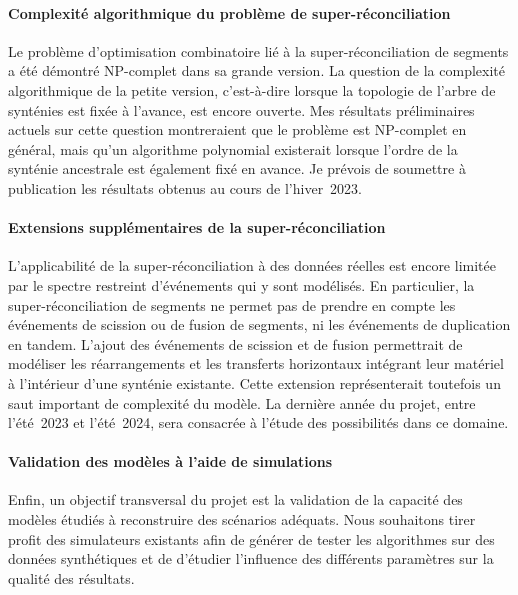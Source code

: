 \paragraph{Complexité algorithmique du problème de super-réconciliation}
Le problème d’optimisation combinatoire lié à la super-réconciliation de segments a été démontré NP-complet dans sa grande version.
La question de la complexité algorithmique de la petite version, c’est-à-dire lorsque la topologie de l’arbre de synténies est fixée à l’avance, est encore ouverte.
Mes résultats préliminaires actuels sur cette question montreraient que le problème est NP-complet en général, mais qu’un algorithme polynomial existerait lorsque l’ordre de la synténie ancestrale est également fixé en avance.
Je prévois de soumettre à publication les résultats obtenus au cours de l’hiver~2023.

\paragraph{Extensions supplémentaires de la super-réconciliation}
L’applicabilité de la super-réconciliation à des données réelles est encore limitée par le spectre restreint d’événements qui y sont modélisés.
En particulier, la super-réconciliation de segments ne permet pas de prendre en compte les événements de scission ou de fusion de segments, ni les événements de duplication en tandem.
L’ajout des événements de scission et de fusion permettrait de modéliser les réarrangements et les transferts horizontaux intégrant leur matériel à l’intérieur d’une synténie existante.
Cette extension représenterait toutefois un saut important de complexité du modèle.
La dernière année du projet, entre l’été~2023 et l’été~2024, sera consacrée à l’étude des possibilités dans ce domaine.

\paragraph{Validation des modèles à l’aide de simulations}
Enfin, un objectif transversal du projet est la validation de la capacité des modèles étudiés à reconstruire des scénarios adéquats.
Nous souhaitons tirer profit des simulateurs existants afin de générer de tester les algorithmes sur des données synthétiques et de d’étudier l’influence des différents paramètres sur la qualité des résultats.
